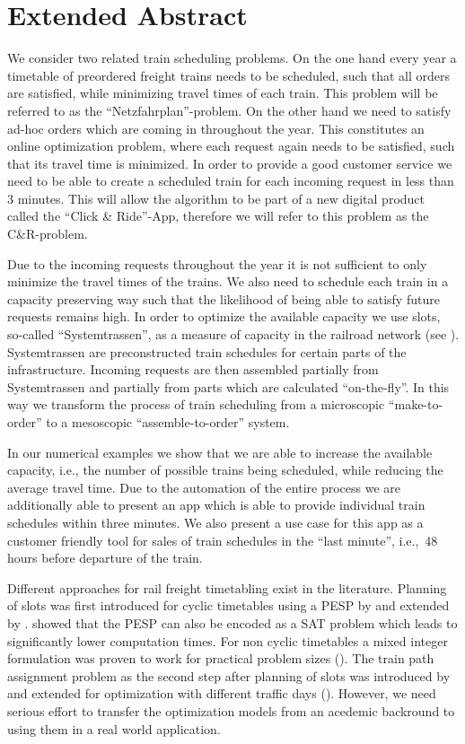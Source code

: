 \section{Extended Abstract}
\label{chap:extAbs}

We consider two related train scheduling problems. On the one hand every year a timetable of preordered freight trains needs to be scheduled, such that all orders are satisfied, while minimizing travel times of each train. This problem will be referred to as the ``Netzfahrplan''-problem. On the other hand we need to satisfy ad-hoc orders which are coming in throughout the year. This constitutes an online optimization problem, where each request again needs to be satisfied, such that its travel time is minimized. In order to provide a good customer service we need to be able to create a scheduled train for each incoming request in less than 3 minutes. This will allow the algorithm to be part of a new digital product called the ``Click \& Ride''-App, therefore we will refer to this problem as the C\&R-problem.

Due to the incoming requests throughout the year it is not sufficient to only minimize the travel times of the trains. We also need to schedule each train in a capacity preserving way such that the likelihood of being able to satisfy future requests remains high. In order to optimize the available capacity we use slots, so-called ``Systemtrassen'', as a measure of capacity in the railroad network (see \cite{FP:2014}). Systemtrassen are preconstructed train schedules for certain parts of the infrastructure. Incoming requests are then assembled partially from Systemtrassen and partially from parts which are calculated ``on-the-fly''.
In this way we transform the process of train scheduling from a microscopic ``make-to-order'' to a mesoscopic ``assemble-to-order'' system.

In our numerical examples we show that we are able to increase the available capacity, i.e., the number of possible trains being scheduled, while reducing the average travel time. Due to the automation of the entire process we are additionally able to present an app which is able to provide individual train schedules within three minutes. We also present a use case for this app as a customer friendly tool for sales of train schedules in the ``last minute'', i.e.,\ 48 hours before departure of the train.

Different approaches for rail freight timetabling exist in the literature. Planning of slots was first introduced for cyclic timetables using a PESP by \cite{N:1998} and extended by \cite{O:2009}. \cite{G:2012} showed that the PESP can also be encoded as a SAT problem which leads to significantly lower computation times. For non cyclic timetables a mixed integer formulation was proven to work for practical problem sizes (\cite{G:2013}).
The train path assignment problem as the second step after planning of slots was introduced by \cite{NO:2014} and extended for optimization with different traffic days (\cite{N:2015}). However, we need serious effort to transfer the optimization models from an acedemic backround to using them in a real world application.

